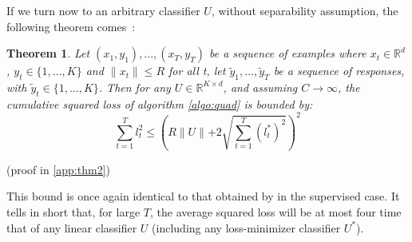 \documentclass[preprint,12pt,authoryear]{elsarticle}
\newtheorem{theorem}{Theorem}
\begin{document}


If we turn now to an arbitrary classifier $U$, without separability assumption, the following theorem comes~:

\begin{theorem}
	\label{theo:BPAT2}
	Let $(x_1,y_1),...,(x_T,y_T)$ be a sequence of examples where $x_t \in \mathbb{R}^d$, $y_t\in \{1,...,K\}$ and $\parallel x_t \parallel\leqslant R$ for all t, let $\tilde{y}_1,...,\tilde{y}_T$ be a sequence of responses, with $\tilde{y}_t\in \{1,...,K\}$. Then for any  $U \in \mathbb{R}^{K\times d}$, and assuming $C \rightarrow \infty$, the cumulative squared loss of algorithm \ref{algo:quad} is bounded by:
	\[\sum_{t=1}^{T}l_t^2 \leqslant \left(R\parallel{U}\parallel+2 \sqrt{\sum_{t=1}^{T}(l_t^{\ast})^2}\right)^2 \]
\end{theorem}

(proof in \ref{app:thm2})

This bound is once again identical to that obtained by 
\cite{crammer2006online} in the supervised case. 
It tells in short that, for large $T$, the average squared 
loss will be at most four time that of any linear 
classifier $U$ (including any loss-minimizer classifier $U^*$). 
\end{document}
